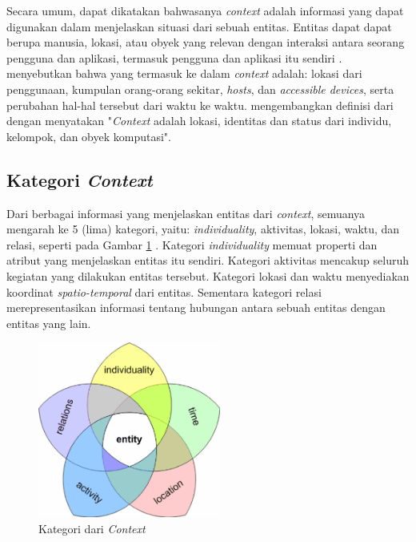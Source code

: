 Secara umum, dapat dikatakan bahwasanya \textit{context} adalah informasi yang dapat digunakan dalam menjelaskan situasi dari sebuah entitas. Entitas dapat dapat berupa manusia, lokasi, atau obyek yang relevan dengan interaksi antara seorang pengguna dan aplikasi, termasuk pengguna dan aplikasi itu sendiri \citep{dey_understanding_2001}. \citep{schilit_context-aware_1994} menyebutkan bahwa yang termasuk ke dalam \textit{context} adalah: lokasi dari penggunaan, kumpulan orang-orang sekitar, \textit{hosts}, dan \textit{accessible devices}, serta perubahan hal-hal tersebut dari waktu ke waktu. \citep{dey_understanding_2001} mengembangkan definisi dari \citep{schilit_context-aware_1994} dengan menyatakan "\textit{Context} adalah lokasi, identitas dan status dari individu, kelompok, dan obyek komputasi".


\subsection{Kategori \textit{Context}}
\label{ssec:context-category}
Dari berbagai informasi yang menjelaskan entitas dari \textit{context}, semuanya mengarah ke 5 (lima) kategori, yaitu: \textit{individuality}, aktivitas, lokasi, waktu, dan relasi, seperti pada Gambar \ref{fig:context-categories} \citep{zimmermann_operational_2007}. Kategori \textit{individuality} memuat properti dan atribut yang menjelaskan entitas itu sendiri. Kategori aktivitas mencakup seluruh kegiatan yang dilakukan entitas tersebut. Kategori lokasi dan waktu menyediakan koordinat \textit{spatio-temporal} dari entitas. Sementara kategori relasi merepresentasikan informasi tentang hubungan antara sebuah entitas dengan entitas yang lain.


\begin{figure}[!]
	\centering
	\includegraphics[width=6cm]{Resources/Images/context-categories}
	\captionsetup{format=hang}
	\caption{Kategori dari \textit{Context}}
	\label{fig:context-categories}
\end{figure}


